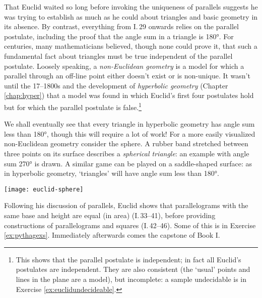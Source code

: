 \label{pg:sphere}

That Euclid waited so long before invoking the uniqueness of parallels suggests he was trying to establish as much as he could about triangles and basic geometry in its absence. By contrast, everything from I.\,29 onwards relies on the parallel postulate, including the proof that the angle sum in a triangle is \ang{180}. For centuries, many mathematicians believed, though none could prove it, that such a fundamental fact about triangles must be true independent of the parallel postulate.\smallbreak
Loosely speaking, a \emph{non-Euclidean geometry} is a model for which a parallel through an off-line point either doesn't exist or is non-unique. It wasn't until the 17--1800s and the development of \emph{hyperbolic geometry} (Chapter \ref{chap:hyper}) that a model was found in which Euclid's first four postulates hold but for which the parallel postulate is false.\footnote{This shows that the parallel postulate is independent; in fact all Euclid's postulates are independent. They are also consistent (the `usual' points and lines in the plane are a model), but incomplete: a sample undecidable is in Exercise \ref{ex:euclidundecideable}.}\par

\begin{minipage}[t]{0.76\linewidth}\vspace{-5pt}
	We shall eventually see that every triangle in hyperbolic geometry has angle sum less than \ang{180}, though this will require a lot of work! For a more easily visualized non-Euclidean geometry consider the sphere. A rubber band stretched between three points on its surface describes a \emph{spherical triangle}: an example with angle sum \ang{270} is drawn. A similar game can be played on a saddle-shaped surface: as in hyperbolic geometry, `triangles' will have angle sum less than \ang{180}.
\end{minipage}
\hfill
\begin{minipage}[t]{0.23\linewidth}\vspace{-10pt}
	\flushright
	\texttt{[image: euclid-sphere]}
\end{minipage}

\goodbreak

\goodbreak


\label{pg:pythagoras}

Following his discussion of parallels, Euclid shows that parallelograms with the same base and height are equal (in area) (I.\,33--41), before providing constructions of parallelograms and squares (I.\,42--46). Some of this is in Exercise \ref{ex:pythagexs}. Immediately afterwards comes the capstone of Book I.


